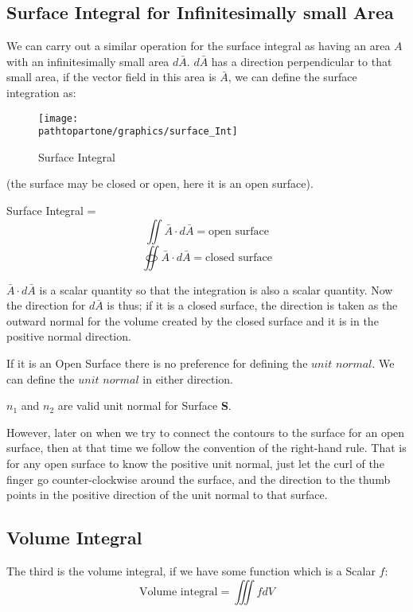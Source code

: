 \subsection{Surface Integral for Infinitesimally small Area}
We can carry out a similar operation for the surface integral as having an area $A$ with an infinitesimally small area $d\bar{A}$. $d\bar{A}$ has a direction perpendicular to that small area, if the vector field in this area is $\bar{A}$, we can define the surface integration as:
\begin{figure}
\centering
\texttt{[image: \\pathtopartone/graphics/surface\_Int]}
\caption{Surface Integral}
\end{figure}
(the surface may be closed or open, here it is an open surface).

Surface Integral =
\begin{equation*}
{   \iint \bar{A} \cdot d\bar{A}= \text{open surface} }
\end{equation*}
\begin{equation}
\oiint \bar{A} \cdot d\bar{A} = \text{closed surface}
\end{equation}

$\bar{A} \cdot d\bar{A}$ is a scalar quantity so that the integration is also a scalar quantity. Now the direction for $d\bar{A}$ is thus; if it is a closed surface, the direction is taken as the outward normal for the volume created by the closed surface and it is in the positive normal direction.

If it is an Open Surface there is no preference for defining the $unit$ $normal$. We can define the $unit$ $normal$ in either direction.

$n_1$ and $n_2$ are valid unit normal for Surface \textbf{S}.

However, later on when we try to connect the contours to the surface for an open surface, then at that time we follow the convention of the right-hand rule. That is for any open surface to know the positive unit normal, just let the curl of the finger go counter-clockwise around the surface, and the direction to the thumb points in the positive direction of the unit normal to that surface.

\subsection{Volume Integral}
The third is the volume integral, if we have some function which is a Scalar $f$:
\begin{dmath*}
\text{Volume integral} = \iiint fdV
\end{dmath*}

